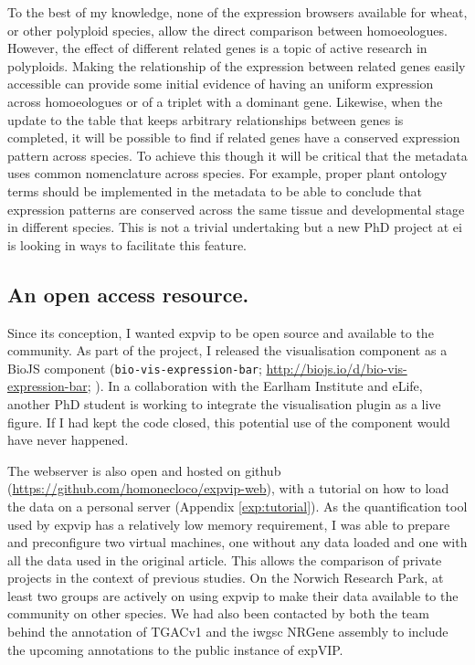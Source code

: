 To the best of my knowledge, none of the expression browsers available for wheat, or other polyploid species, allow the direct comparison between homoeologues. However, the effect of different related genes is a topic of active research in polyploids. 
Making the relationship of the expression between related genes easily accessible can provide some initial evidence of having an uniform expression across homoeologues or of a triplet with a dominant gene. 
Likewise, when the update to the table that keeps arbitrary relationships between genes is completed, it will be possible to find if related genes have a conserved expression pattern across species. 
To achieve this though it will be critical that the metadata uses common nomenclature across species. 
For example, proper plant ontology \citep{Cooper2013} terms should be implemented in the metadata to be able to conclude that expression patterns are conserved across the same tissue and developmental stage in different species. 
This is not a trivial undertaking but a new PhD project at \gls{ei} is looking in ways to facilitate this feature. 

\subsection{An open access resource.}
Since its conception, I wanted \gls{expvip} to be open source and available to the community. 
As part of the project, I released the visualisation component as a BioJS component  (\texttt{bio-vis-expression-bar}; \url{http://biojs.io/d/bio-vis-expression-bar}; \citealt{Yachdav2015}).
In a collaboration with the Earlham Institute and eLife, another PhD student is working to integrate the visualisation plugin as a live figure. 
If I had kept the code closed, this potential use of the component would have never happened. 

The webserver is also open and hosted on github (\url{https://github.com/homonecloco/expvip-web}), with a tutorial on how to load the data on a personal server (Appendix \ref{exp:tutorial}). 
As the quantification tool used by \gls{expvip} has a relatively low memory requirement, I was able to prepare and preconfigure two virtual machines, one without any data loaded and one with all the data used in the original article.%
This allows the comparison of private projects in the context of previous studies. 
On the Norwich Research Park, at least two groups are actively on using \gls{expvip} to make their data available to the community on other species.
We had also been contacted by both the team behind the annotation of TGACv1 and the \gls{iwgsc} NRGene assembly to include the upcoming annotations to the public instance of expVIP. 

